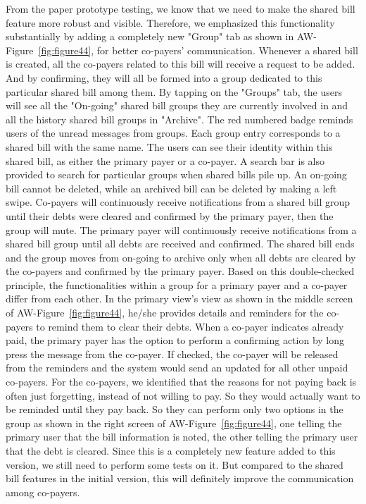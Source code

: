 \documentclass{sigchi}
\begin{document}
From the paper prototype testing, we know that we need to make the shared bill feature more robust and visible. Therefore, we emphasized this functionality substantially by adding a completely new "Group" tab as shown in AW-Figure~\ref{fig:figure44}, for better co-payers' communication. Whenever a shared bill is created, all the co-payers related to this bill will receive a request to be added. And by confirming, they will all be formed into a group dedicated to this particular shared bill among them. By tapping on the "Groups" tab, the users will see all the "On-going" shared bill groups they are currently involved in and all the history shared bill groups in "Archive". The red numbered badge reminds users of the unread messages from groups. Each group entry corresponds to a shared bill with the same name. The users can see their identity within this shared bill, as either the primary payer or a co-payer. A search bar is also provided to search for particular groups when shared bills pile up. An on-going bill cannot be deleted, while an archived bill can be deleted by making a left swipe. Co-payers will continuously receive notifications from a shared bill group until their debts were cleared and confirmed by the primary payer, then the group will mute. The primary payer will continuously receive notifications from a shared bill group until all debts are received and confirmed. The shared bill ends and the group moves from on-going to archive only when all debts are cleared by the co-payers and confirmed by the primary payer. Based on this double-checked principle, the functionalities within a group for a primary payer and a co-payer differ from each other. In the primary view's view as shown in the middle screen of AW-Figure~\ref{fig:figure44}, he/she provides details and reminders for the co-payers to remind them to clear their debts. When a co-payer indicates already paid, the primary payer has the option to perform a confirming action by long press the message from the co-payer. If checked, the co-payer will be released from the reminders and the system would send an updated for all other unpaid co-payers. For the co-payers, we identified that the reasons for not paying back is often just forgetting, instead of not willing to pay. So they would actually want to be reminded until they pay back. So they can perform only two options in the group as shown in the right screen of AW-Figure~\ref{fig:figure44}, one telling the primary user that the bill information is noted, the other telling the primary user that the debt is cleared. Since this is a completely new feature added to this version, we still need to perform some tests on it. But compared to the shared bill features in the initial version, this will definitely improve the communication among co-payers. 
\end{document}
